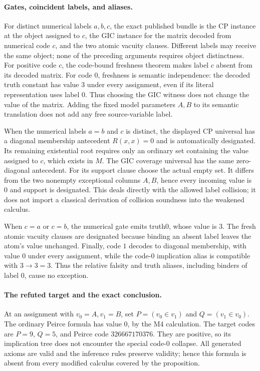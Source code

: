 \paragraph{Gates, coincident labels, and aliases.}
For distinct numerical labels $a,b,c$, the exact published bundle
is the CP instance at the object assigned to $c$, the GIC instance
for the matrix decoded from numerical code $c$, and the two atomic
vacuity clauses.  Different labels may receive the same object;
none of the preceding arguments requires object distinctness.
For positive code $c$, the code-bound freshness theorem makes label
$c$ absent from its decoded matrix.  For code $0$, freshness is semantic
independence: the decoded truth constant has value $3$ under every
assignment, even if its literal representation uses label $0$.  Thus
choosing the GIC witness does not change the value of the matrix.  Adding
the fixed model parameters $A,B$ to its semantic translation does
not add any free source-variable label.

When the numerical labels $a=b$ and $c$ is distinct, the displayed
CP universal has a diagonal membership antecedent $R(x,x)=0$ and
is automatically designated.  Its remaining existential root
requires only an ordinary set containing the value assigned to
$c$, which exists in $M$.  The GIC coverage universal has the same
zero-diagonal antecedent.  For its support clause choose the actual
empty set.  It differs from the two nonempty exceptional columns
$A,B$, hence every incoming value is $0$ and support is designated.
This deals directly with the allowed label collision; it does not
import a classical derivation of collision soundness into the
weakened calculus.

When $c=a$ or $c=b$, the numerical gate emits truth0, whose value is
$3$.  The fresh atomic vacuity clauses are designated because
binding an absent label leaves the atom's value unchanged.
Finally, code $1$ decodes to diagonal membership, with value $0$
under every assignment, while the code-$0$ implication alias is
compatible with $3\to3=3$.  Thus the relative falsity and
truth aliases, including binders of label $0$, cause no exception.

\paragraph{The refuted target and the exact conclusion.}
At an assignment with $v_0=A,v_1=B$, set
$P=(v_0\in v_1)$ and $Q=(v_1\in v_0)$.
The ordinary Peirce formula has value $0$, by the M4 calculation.
The target codes are $P=9$, $Q=5$, and Peirce code
$326667170376$.  They are positive, so its implication tree does not
encounter the special code-$0$ collapse.  All generated
axioms are valid and the inference rules preserve validity;
hence this formula is absent from every modified calculus covered
by the proposition.

